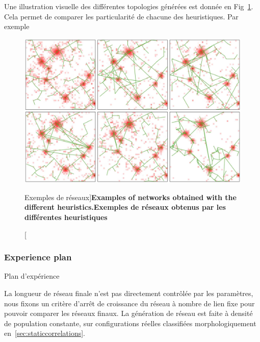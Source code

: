 Une illustration visuelle des différentes topologies générées est donnée en Fig~\ref{fig:networkgrowth:examples}. Cela permet de comparer les particularité de chacune des heuristiques. Par exemple




\begin{figure}
	\includegraphics[width=\linewidth]{Figures/Final/7-1-2-fig-networkgrowth-examples.jpg}
\caption[Network examples][Exemples de réseaux]{\textbf{Examples of networks obtained with the different heuristics.}\label{fig:networkgrowth:examples}}{\textbf{Exemples de réseaux obtenus par les différentes heuristiques}\label{fig:networkgrowth:examples}}
\end{figure}




\subsubsection{Experience plan}{Plan d'expérience}



La longueur de réseau finale n'est pas directement contrôlée par les paramètres, nous fixons un critère d'arrêt de croissance du réseau à nombre de lien fixe pour pouvoir comparer les réseaux finaux. La génération de réseau est faite à densité de population constante, sur configurations réelles classifiées morphologiquement en~\ref{sec:staticcorrelations}. 

